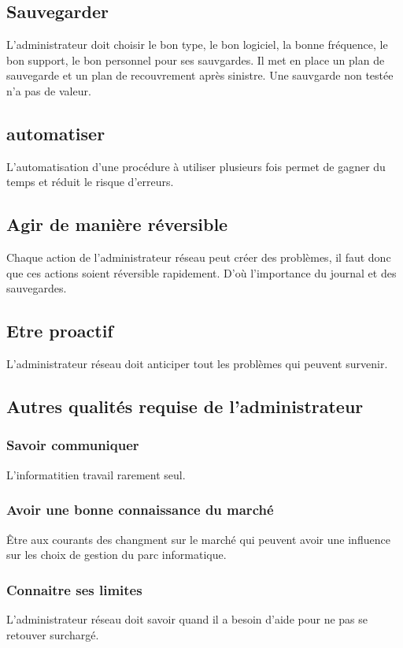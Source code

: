  \subsection{Sauvegarder}
 L'administrateur doit choisir le bon type, le bon logiciel, la bonne fréquence, le bon support, le bon personnel pour ses sauvgardes. Il met en place un plan de sauvegarde et un plan de recouvrement après sinistre.
 Une sauvgarde non testée n'a pas de valeur.

 \subsection{automatiser}
 L'automatisation d'une procédure à utiliser plusieurs fois permet de gagner du temps et réduit le risque d'erreurs.

 \subsection{Agir de manière réversible}
 Chaque action de l'administrateur réseau peut créer des problèmes, il faut donc que ces actions soient réversible rapidement. D'où l'importance du journal et des sauvegardes.

 \subsection{Etre proactif}
 L'administrateur réseau doit anticiper tout les problèmes qui peuvent survenir.

 \subsection{Autres qualités requise de l'administrateur}
 \subsubsection{Savoir communiquer}
 L'informatitien travail rarement seul.
 \subsubsection{Avoir une bonne connaissance du marché}
 Être aux courants des changment sur le marché qui peuvent avoir une influence sur les choix de gestion du parc informatique.
 \subsubsection{Connaitre ses limites}
 L'administrateur réseau doit savoir quand il a besoin d'aide pour ne pas se retouver surchargé.

